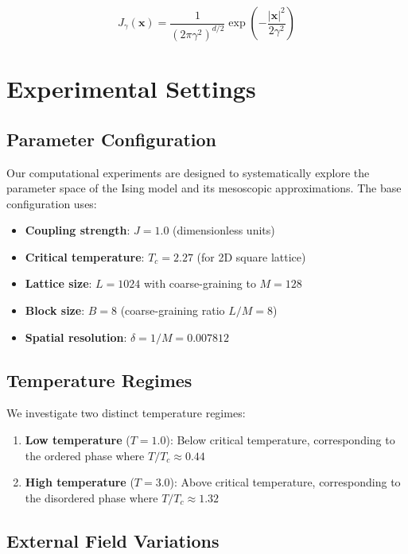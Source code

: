 \documentclass[11pt,a4paper]{article}
\begin{document}
\begin{equation}
    J_\gamma(\mathbf{x}) = \frac{1}{(2\pi\gamma^2)^{d/2}} \exp\left(-\frac{|\mathbf{x}|^2}{2\gamma^2}\right)
\end{equation}


\section{Experimental Settings}

\subsection{Parameter Configuration}

Our computational experiments are designed to systematically explore the parameter space of the Ising model and its mesoscopic approximations. The base configuration uses:

\begin{itemize}
    \item \textbf{Coupling strength}: $J = 1.0$ (dimensionless units)
    \item \textbf{Critical temperature}: $T_c = 2.27$ (for 2D square lattice)
    \item \textbf{Lattice size}: $L = 1024$ with coarse-graining to $M = 128$
    \item \textbf{Block size}: $B = 8$ (coarse-graining ratio $L/M = 8$)
    \item \textbf{Spatial resolution}: $\delta = 1/M = 0.007812$
\end{itemize}

\subsection{Temperature Regimes}

We investigate two distinct temperature regimes:

\begin{enumerate}
    \item \textbf{Low temperature} ($T = 1.0$): Below critical temperature, corresponding to the ordered phase where $T/T_c \approx 0.44$
    \item \textbf{High temperature} ($T = 3.0$): Above critical temperature, corresponding to the disordered phase where $T/T_c \approx 1.32$
\end{enumerate}

\subsection{External Field Variations}
\end{document}
